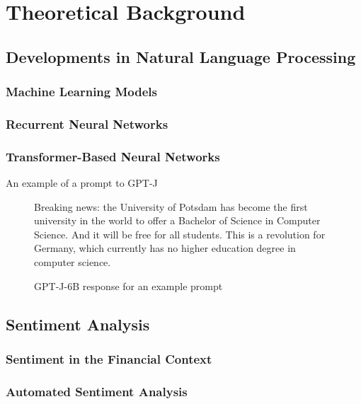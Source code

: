 \section{Theoretical Background}

\subsection{Developments in Natural Language Processing}
\subsubsection{Machine Learning Models}
\subsubsection{Recurrent Neural Networks}
\subsubsection{Transformer-Based Neural Networks}



An example of a prompt to GPT-J \cite{gpt-j}
	
\begin{figure}[!ht]
	\centering
	\begin{tcolorbox}[colframe=up-blue,title=Prompt: ``Breaking news: the University of Potsdam'',width=0.9\textwidth]
		Breaking news: the University of Potsdam has become the first university in the world to offer a Bachelor of Science in Computer Science. And it will be free for all students. This is a revolution for Germany, which currently has no higher education degree in computer science.
	\end{tcolorbox}
	\caption{GPT-J-6B response for an example prompt}
	\label{example_prompt}
\end{figure}



\subsection{Sentiment Analysis}  %
\subsubsection{Sentiment in the Financial Context}
\subsubsection{Automated Sentiment Analysis}